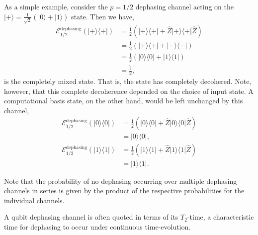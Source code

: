\documentclass[aps, rmp, twocolumn, amsmath, amssymb, nofootinbib, superscriptaddress, longbibliography, floatfix, table-of-contents, eqsecnum]{revtex4-1}
\newcommand{\bra}[1]{\langle#1|}
\newcommand{\ket}[1]{|#1\rangle}
\begin{document}
As a simple example, consider the \mbox{$p=1/2$} dephasing channel acting on the \mbox{$\ket{+} = \frac{1}{\sqrt{2}}(\ket{0}+\ket{1})$} state. Then we have,
\begin{align}
\mathcal{E}^\text{dephasing}_{1/2}(\ket{+}\bra{+}) &= \frac{1}{2} (\ket{+}\bra{+} + \hat{Z}\ket{+}\bra{+}\hat{Z}) \nonumber \\
&= \frac{1}{2} (\ket{+}\bra{+} + \ket{-}\bra{-}) \nonumber \\
&= \frac{1}{2} (\ket{0}\bra{0} + \ket{1}\bra{1}) \nonumber \\
&= \frac{\mathbb{\hat{I}}}{2},
\end{align}
is the completely mixed state. That is, the state has completely decohered. Note, however, that this complete decoherence depended on the choice of input state. A computational basis state, on the other hand, would be left unchanged by this channel,
\begin{align}
\mathcal{E}^\text{dephasing}_{1/2}(\ket{0}\bra{0}) &= \frac{1}{2} (\ket{0}\bra{0} + \hat{Z}\ket{0}\bra{0}\hat{Z}) \nonumber \\
&= \ket{0}\bra{0}, \nonumber \\
\mathcal{E}^\text{dephasing}_{1/2}(\ket{1}\bra{1}) &= \frac{1}{2} (\ket{1}\bra{1} + \hat{Z}\ket{1}\bra{1}\hat{Z}) \nonumber \\
&= \ket{1}\bra{1}.
\end{align}

Note that the probability of no dephasing occurring over multiple dephasing channels in series is given by the product of the respective probabilities for the individual channels.

A qubit dephasing channel is often quoted in terms of its $T_2$-time, a characteristic time for dephasing to occur under continuous time-evolution.
\end{document}
